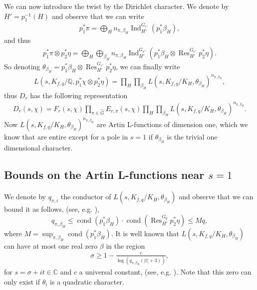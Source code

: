 \documentclass[12pt]{amsart}
\def\C{{\mathbb C}}
\def\Q{{\mathbb Q}}
\def\le{\leqslant}
\def\ge{\geqslant}
\begin{document}
We can now introduce the twist by the Dirichlet character. We denote by $H'=p_1^{-1}(H)$ and observe that we can write
\begin{align*}
p_1^\ast \pi = \bigoplus_{H } n_{\pi, \beta_H} \operatorname{Ind}_{H'}^{G_{r'}} (p_1^\ast \beta_H),
\end{align*}
and thus
\begin{align*}
p_1^\ast \pi \otimes p_2^\ast \eta = \bigoplus_{H}\bigoplus_{\beta_H} n_{\pi, \beta_H} \operatorname{Ind}_{H'}^{G_{r'}}(p_1^\ast \beta_H \otimes \operatorname{Res}_{H'}^{G_{r'}}p_2^\ast \eta).
\end{align*}
So denoting $\theta_{\beta_H}=p_1^\ast\beta_{H} \otimes \operatorname{Res}_{H'}^{G_{r'}}p_2^\ast \eta$,  we can finally write
\begin{align*}
L(s, K_{f,q}/\Q, p_1^\ast \chi \otimes p_2^\ast\eta) = \prod_{H} \prod_{\beta_H} L(s, K_{f,q} /K_H, \theta_{\beta_H})^{n_{\pi,  \beta_H}}, 
\end{align*}
thus $D_r$ has the following representation
\begin{align}
\label{repres}
D_r(s,\chi) = F_{r}(s,\chi) \prod_{\pi \in \hat{G}} E_{r, \pi}(s,\chi) \prod_{H}\prod_{\beta_H} L(s, K_{f,q} /K_H, \theta_{\beta_H})^{n_{\pi, \beta_H}}.
\end{align}
 Now $L(s, K_{f,q} /K_H, \theta_{\beta_H})^{n_{\pi, \beta_H}}$ are Artin L-functions of dimension one, which we know that are entire except for a pole in $s=1$ if $\theta_{\beta_H}$ is the trivial one dimensional character. 

\subsection{Bounds on the Artin L-functions near $s=1$}


We denote by $q_{\pi,i}$ the conductor of $L(s, K_{f,q} /K_H, \theta_{\beta_H})$ and observe that we can bound it as follows, (see, e.g. \cite{BH}), 
$$q_{\pi,\beta_H} \le \operatorname{cond}(p_1^\ast\beta_{H}) \cdot \operatorname{cond}(\operatorname{Res}_{H'}^{G_q}p_2^\ast \eta) \le M q,$$
where $M = \sup_{\pi,\beta_H} \operatorname{cond}(p_1^\ast\beta_{H})$.
It is well known that $L(s, K_{f,q} /K_H, \theta_{\beta_H})$ can have at most one real zero $\beta$ in the region
\begin{align}
\label{eq:zerofree}
\sigma \ge 1 - \frac{c}{\log( {q_{\pi, \beta_H}} (|t|+3))},
\end{align}
for  $s=\sigma + it \in \C$ and $c$ a universal constant, (see, e.g. \cite[Theorem 5.35]{I-K}). Note that this zero can only exist if $\theta_i$ is a quadratic character.
\end{document}
